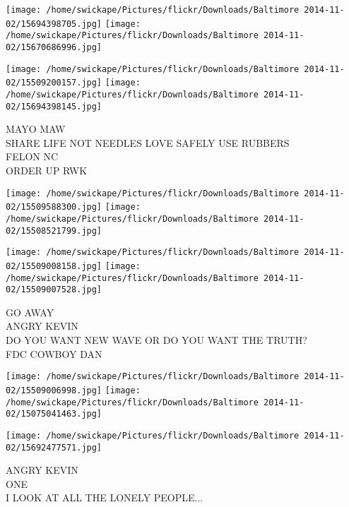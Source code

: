 \documentclass[10pt,letterpaper]{article}
\begin{document}
\texttt{[image: /home/swickape/Pictures/flickr/Downloads/Baltimore 2014-11-02/15694398705.jpg]}
\texttt{[image: /home/swickape/Pictures/flickr/Downloads/Baltimore 2014-11-02/15670686996.jpg]}

\texttt{[image: /home/swickape/Pictures/flickr/Downloads/Baltimore 2014-11-02/15509200157.jpg]}
\texttt{[image: /home/swickape/Pictures/flickr/Downloads/Baltimore 2014-11-02/15694398145.jpg]}

MAYO MAW\\
SHARE LIFE NOT NEEDLES LOVE SAFELY USE RUBBERS\\
FELON NC\\
ORDER UP RWK\\
\pagebreak

\texttt{[image: /home/swickape/Pictures/flickr/Downloads/Baltimore 2014-11-02/15509588300.jpg]}
\texttt{[image: /home/swickape/Pictures/flickr/Downloads/Baltimore 2014-11-02/15508521799.jpg]}

\texttt{[image: /home/swickape/Pictures/flickr/Downloads/Baltimore 2014-11-02/15509008158.jpg]}
\texttt{[image: /home/swickape/Pictures/flickr/Downloads/Baltimore 2014-11-02/15509007528.jpg]}

GO AWAY\\
ANGRY KEVIN\\
DO YOU WANT NEW WAVE OR DO YOU WANT THE TRUTH?\\
FDC COWBOY DAN\\
\pagebreak

\texttt{[image: /home/swickape/Pictures/flickr/Downloads/Baltimore 2014-11-02/15509006998.jpg]}
\texttt{[image: /home/swickape/Pictures/flickr/Downloads/Baltimore 2014-11-02/15075041463.jpg]}

\texttt{[image: /home/swickape/Pictures/flickr/Downloads/Baltimore 2014-11-02/15692477571.jpg]}

ANGRY KEVIN\\
ONE\\
I LOOK AT ALL THE LONELY PEOPLE...\\
\pagebreak
\end{document}
